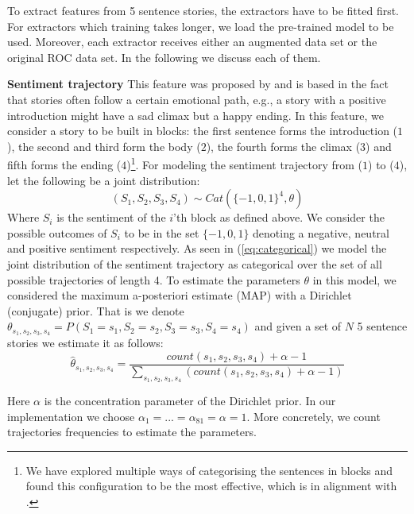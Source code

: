 \documentclass{article}
\begin{document}
To extract features from 5 sentence stories, the extractors have to be fitted
first. For extractors which training takes longer, we load the pre-trained model
to be used. Moreover, each extractor receives either an augmented data set or
the original ROC data set. In the following we discuss each of them.



\textbf{Sentiment trajectory} This feature was proposed by
\cite{COGCOMP} and is based in the fact that stories often follow a certain
emotional path, e.g., a story with a positive introduction might have a sad
climax but a happy ending. In this feature, we consider a story to be built in
blocks: the first sentence forms the introduction ($1$), the second
and third form the body ($2$), the fourth forms the climax ($3$) and fifth forms
the ending ($4$)\footnote{We have explored multiple ways of categorising the
    sentences in blocks and found this configuration to be the most effective,
    which is in alignment with \cite{COGCOMP}.}. For modeling the sentiment 
trajectory from ($1$) to ($4$), let the following be a joint distribution:
\begin{equation}
\label{eq:categorical}
(S_1, S_2,S_3,S_4) \sim Cat(\{-1,0,1\}^4, \theta)
\end{equation}
Where $S_i$ is the sentiment of the $i$'th block as defined above. We consider the possible outcomes of $S_i$ to be in the set $\{-1,0,1\}$ denoting a negative, neutral and positive sentiment respectively.  As seen in (\ref{eq:categorical}) we model the joint distribution of the sentiment trajectory as categorical over the set of all possible trajectories of length 4. To estimate the parameters $\theta$ in this model, we considered the maximum a-posteriori estimate (MAP) with a Dirichlet (conjugate) prior. That is we denote $\theta_{s_1,s_2,s_3,s_4} = P(S_1 = s_1, S_2=s_2, S_3=s_3, S_4=s_4)$ and given a set of $N$ 5 sentence stories we estimate it as follows:
\begin{equation}
\label{eq:estimate_sentiment}
\hat{\theta}_{s_1,s_2,s_3,s_4} = \frac{count(s_1,s_2,s_3,s_4) + \alpha - 1}{\sum\limits_{s_1,s_2,s_3,s_4}(count(s_1,s_2,s_3,s_4) + \alpha-1) }
\end{equation}

Here $\alpha$ is the concentration parameter of the Dirichlet prior. In our
implementation we choose $\alpha_1 = ... = \alpha_{81} = \alpha = 1$.
More concretely, we count trajectories frequencies to estimate the parameters.
\end{document}
